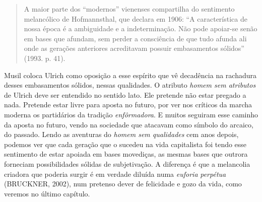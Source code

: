 \begin{quote}
A maior parte dos ``modernos'' vienenses compartilha do sentimento
melancólico de Hofmannsthal, que declara em 1906: ``A característica de
nossa época é a ambiguidade e a indeterminação. Não pode apoiar-se senão
em bases que afundam, sem perder a consciência de que tudo afunda ali
onde as gerações anteriores acreditavam possuir embasamentos sólidos''
(1993. p. 41).
\end{quote}

Musil coloca Ulrich como oposição a esse espírito que vê decadência na
rachadura desses embasamentos sólidos, nessas qualidades. O atributo
\emph{homem sem atributos} de Ulrich deve ser entendido no sentido lato.
Ele pretende não estar pregado a nada. Pretende estar livre para aposta
no futuro, por ver nos críticos da marcha moderna os partidários da
tradição \emph{enfôrmadora}. E muitos seguiram esse caminho da aposta no
futuro, vendo na sociedade que atacavam como símbolo do arcaico, do
passado. Lendo as aventuras do \emph{homem sem qualidades} cem anos
depois, podemos ver que cada geração que o sucedeu na vida capitalista
foi tendo esse sentimento de estar apoiada em bases movediças, as mesmas
bases que outrora forneciam possibilidades sólidas de subjetivação. A
diferença é que a melancolia criadora que poderia surgir é em verdade
diluída numa \emph{euforia} \emph{perpétua} (BRUCKNER, 2002), num
pretenso dever de felicidade e gozo da vida, como veremos no último
capítulo.

